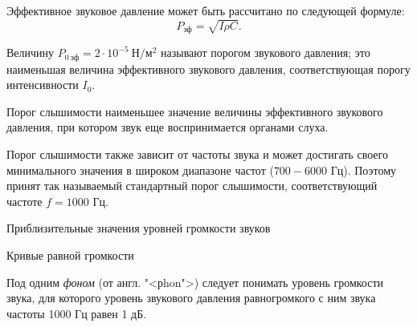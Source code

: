 \documentclass{beamer}
\begin{document}
\begin{frame}
Эффективное звуковое давление может быть рассчитано по следующей формуле:
\[P_{\text{эф}}=\sqrt{I \rho C}.\]

Величину \(P_{0~\text{эф}}=2\cdot10^{-5}\ \text{Н}/\text{м}^2\) называют порогом звукового давления; это наименьшая величина эффективного звукового давления, соответствующая порогу интенсивности $I_0$.

\begin{block}{Порог слышимости}
наименьшее значение величины эффективного звукового давления, при котором звук еще воспринимается органами слуха. 
\end{block}
Порог слышимости также зависит от частоты звука и может достигать своего минимального значения в широком диапазоне частот ($700-6000$ Гц). Поэтому принят так называемый стандартный порог слышимости, соответствующий частоте $f=1000$ Гц.
\end{frame}
 

\begin{frame}
\begin{block}{Приблизительные значения уровней громкости звуков}
\end{block}
\end{frame} 

\begin{frame}
\begin{block}{Кривые равной громкости}
\end{block}
Под одним {\itshape фоном} (от англ. "<рhon">) следует понимать уровень громкости звука, для которого уровень звукового давления равногромкого с ним звука частоты 1000 Гц равен 1 дБ. 
\end{frame} 
\end{document}
